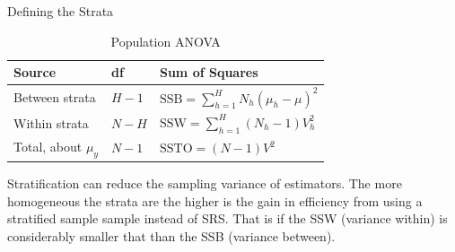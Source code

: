 \documentclass{beamer}\usepackage[]{graphicx}\usepackage[]{color}
\begin{document}
% 

\begin{frame}{Defining the Strata}
  \begin{table}\caption{Population ANOVA}
  \begin{tabular}{l | l | l }
  Source & df & Sum of Squares  \\
  \hline
   Between strata         & $H-1$ & $\text{SSB}  = \sum_{h=1}^H N_h ( \mu_{h} - \mu  )^2$  \\
   Within  strata         & $N-H$ & $\text{SSW}  = \sum_{h=1}^H (N_h-1) V_{h}^2$  \\
   Total,  about  $\mu_y$ & $N-1$ & $\text{SSTO} = (N-1) V^2$ \\
  \end{tabular}
  \end{table}
Stratification can reduce the sampling variance of estimators. The more homogeneous the strata are the higher is the gain in efficiency from using a stratified sample sample instead of SRS. That is if the SSW (variance within) is
considerably smaller that than the SSB (variance between). 
\end{frame}
\end{document}
